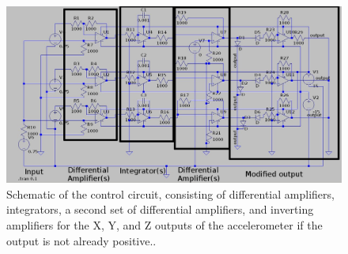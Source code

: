 
\begin{figure}[h]
	\centering
	\includegraphics[width=\textwidth]{ctrl_mod.jpg}
	\caption{Schematic of the control circuit, consisting of differential amplifiers, integrators, a second set of differential amplifiers, and inverting amplifiers for the X, Y, and Z outputs of the accelerometer if the output is not already positive..}
	\label{fig:ctrl}
\end{figure}
